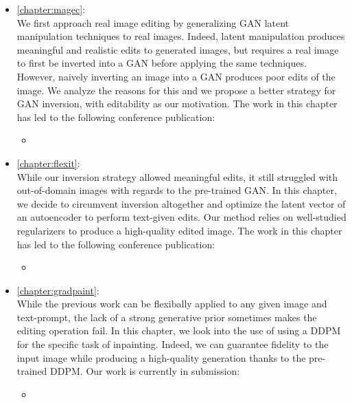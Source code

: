 \begin{itemize}
      \item \autoref{chapter:magec}: \\
            We first approach real image editing by generalizing \ac{GAN} latent manipulation techniques 
            to real images. Indeed, latent manipulation produces meaningful and realistic edits to 
            generated images, but requires a real image to first be inverted into a \ac{GAN} before applying the same techniques. 
            However, naively inverting an image into a \ac{GAN} produces poor edits of the image. We analyze the reasons for this and we 
            propose a better strategy for \ac{GAN} inversion, with editability as our motivation. The work in this chapter has led to the following 
            conference publication:
            \begin{itemize}
                \item {}
            \end{itemize}


      \item \autoref{chapter:flexit}: \\
            While our inversion strategy allowed meaningful edits, it still struggled with 
            out-of-domain images with regards to the pre-trained \ac{GAN}. In this chapter,  we  decide to 
            circumvent inversion altogether and optimize the latent vector of an autoencoder to 
            perform text-given edits. Our method relies on well-studied regularizers to produce a 
            high-quality edited image. The work in this chapter has led to the following 
            conference publication:
            \begin{itemize}
                  \item {}
            \end{itemize}

      \item \autoref{chapter:gradpaint}: \\
            While the previous work can be flexibally applied to any given image and text-prompt, the 
            lack of a strong generative prior sometimes makes the editing operation fail. In this chapter, 
            we look into the use of using a \ac{DDPM} for the specific task of inpainting. Indeed, we can 
            guarantee fidelity to the input image while producing a high-quality generation thanks to the 
            pre-trained \ac{DDPM}. Our work is currently in submission:
            \begin{itemize}
                  \item {}
            \end{itemize}
\end{itemize}





